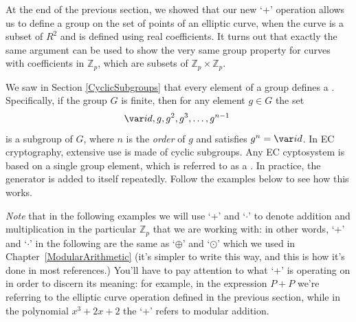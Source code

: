 At the end of the previous section, we showed that our new  `+' operation allows us to define a group on the set of points of an elliptic curve, when the curve is a subset of $R^2$ and is defined using real coefficients.  It turns out that exactly the same argument can be used to show the very same group property for curves with coefficients in $\mathbb{Z}_p$, which are subsets of $\mathbb{Z}_p \times \mathbb{Z}_p$.  

We saw in Section \ref{CyclicSubgroups} that every element of a group defines a . Specifically, if the group $G$ is finite, then for any element $g \in G$ the set 
\[ {\var id}, g, g^2, g^3, \ldots, g^{n-1} \ \]
is a subgroup of $G$, where $n$ is the \emph{order} of $g$ and satisfies $g^n = {\var id}$. In EC cryptography, extensive use is made of cyclic subgroups.  Any EC cyptosystem is based on a single group element, which is referred to as a .  In practice, the generator is added to itself repeatedly. Follow the examples below to see how this works.

\emph{Note} that in the following examples we will use `+'  and `$\cdot$' to denote addition and multiplication in the particular  $\mathbb{Z}_p$ that we are working with: in other words, `+' and `$\cdot$' in the following are the same as `$\oplus$' and `$\odot$' which we used in Chapter~\ref{ModularArithmetic}  (it's simpler to write this way, and this is how it's done in most references.) You'll have to pay attention to what `+' is operating on in order to discern its meaning:  for example, in the expression $P+P$ we're referring to the elliptic curve operation defined in the previous section, while in the polynomial $x^3 + 2x + 2$  the `+' refers to modular addition. 

